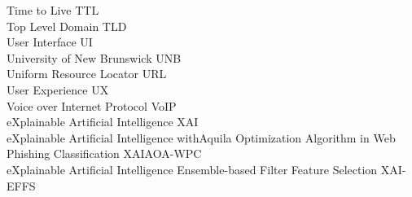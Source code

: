 Time to Live \hfill TTL\\
Top Level Domain \hfill TLD\\
User Interface \hfill UI\\
University of New Brunswick \hfill UNB\\
Uniform Resource Locator \hfill URL\\
User Experience \hfill UX\\
Voice over Internet Protocol \hfill VoIP\\
eXplainable Artificial Intelligence \hfill XAI\\
eXplainable Artificial Intelligence with\newline Aquila Optimization Algorithm in Web Phishing Classification \hfill XAIAOA-WPC\\
eXplainable Artificial Intelligence Ensemble-based Filter Feature Selection \hfill XAI-EFFS\\
